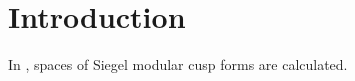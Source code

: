 
\section{Introduction}

In \cite{PoorYuen07Comp}, spaces of Siegel modular cusp forms are calculated.




